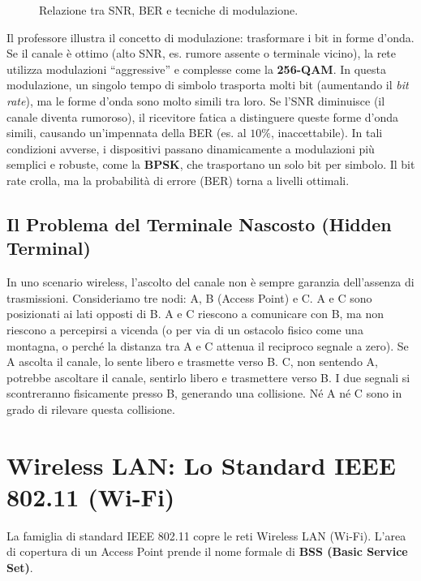 \begin{figure}[H]
    \centering
    \caption{Relazione tra SNR, BER e tecniche di modulazione.}
    \label{fig:snr-ber}
\end{figure}

Il professore illustra il concetto di modulazione: trasformare i bit in forme d'onda. 
Se il canale è ottimo (alto SNR, es. rumore assente o terminale vicino), la rete utilizza modulazioni ``aggressive'' e complesse come la \textbf{256-QAM}. In questa modulazione, un singolo tempo di simbolo trasporta molti bit (aumentando il \textit{bit rate}), ma le forme d'onda sono molto simili tra loro. 
Se l'SNR diminuisce (il canale diventa rumoroso), il ricevitore fatica a distinguere queste forme d'onda simili, causando un'impennata della BER (es. al $10\%$, inaccettabile). In tali condizioni avverse, i dispositivi passano dinamicamente a modulazioni più semplici e robuste, come la \textbf{BPSK}, che trasportano un solo bit per simbolo. Il bit rate crolla, ma la probabilità di errore (BER) torna a livelli ottimali.

\subsection{Il Problema del Terminale Nascosto (Hidden Terminal)}
In uno scenario wireless, l'ascolto del canale non è sempre garanzia dell'assenza di trasmissioni.
Consideriamo tre nodi: A, B (Access Point) e C. A e C sono posizionati ai lati opposti di B.
A e C riescono a comunicare con B, ma non riescono a percepirsi a vicenda (o per via di un ostacolo fisico come una montagna, o perché la distanza tra A e C attenua il reciproco segnale a zero).
Se A ascolta il canale, lo sente libero e trasmette verso B. C, non sentendo A, potrebbe ascoltare il canale, sentirlo libero e trasmettere verso B. I due segnali si scontreranno fisicamente presso B, generando una collisione. Né A né C sono in grado di rilevare questa collisione.

\section{Wireless LAN: Lo Standard IEEE 802.11 (Wi-Fi)}
La famiglia di standard IEEE 802.11 copre le reti Wireless LAN (Wi-Fi). 
L'area di copertura di un Access Point prende il nome formale di \textbf{BSS (Basic Service Set)}. 

